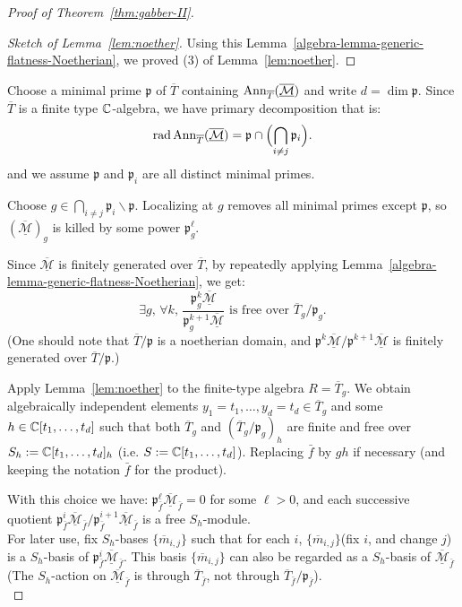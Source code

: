 \begin{proof}[Proof of Theorem~\ref{thm:gabber-II}]
\begin{proof}[Sketch of Lemma~\ref{lem:noether}]
		Using this Lemma~\ref{algebra-lemma-generic-flatness-Noetherian}, we proved (3) of Lemma~\ref{lem:noether}.
	\end{proof}



	Choose a minimal prime $\mathfrak p$ of $\overline T$ containing $\operatorname{Ann}_{\overline T}(\overline{\underline{\mathcal M}})$
	and write $d=\dim \mathfrak p$. Since $\overline T$ is a finite type $\mathbb{C}$-algebra, we have primary decomposition that is:
	\[
		\operatorname{rad}\operatorname{Ann}_{\overline T}(\overline{\underline{\mathcal M}})
		= \mathfrak p \cap \Bigl(\bigcap_{i\ne j} \mathfrak p_i\Bigr).
	\]
	and we assume $\mathfrak p$ and $\mathfrak p_i$ are all distinct minimal primes.

	Choose $g\in\bigcap_{i\ne j}\mathfrak p_i\smallsetminus \mathfrak p$. Localizing at $g$ removes all
	minimal primes except $\mathfrak p$, so $(\overline{\underline{\mathcal M}})_{g}$ is killed by some power
	$\mathfrak p_{g}^\ell$.

	Since $\overline{\underline{\mathcal M}}$ is finitely generated over $\overline T$, by repeatedly applying Lemma~\ref{algebra-lemma-generic-flatness-Noetherian}, we get:
	\[
		\exists g,\, \forall k,\, \frac{\mathfrak p^k_g \overline{\underline{\mathcal M}}}{\mathfrak p^{k+1}_g \overline{\underline{\mathcal M}}} \text{ is free over } \overline{T}_g/\mathfrak p_g.
	\]
	(One should note that $\overline{T}/ \mathfrak p$ is a noetherian domain, and $\mathfrak p^k \overline{\underline{\mathcal M}}/ \mathfrak p^{k+1} \overline{\underline{\mathcal M}}$ is finitely generated over $\overline{T}/ \mathfrak p$.)


	Apply Lemma~\ref{lem:noether} to the finite-type algebra $R=\overline T_{g}$. We obtain algebraically
	independent elements $y_1=t_1,\dots,y_d=t_d\in\overline T_{g}$ and some $h\in\mathbb{C}[t_1,\dots,t_d]$ such that both $\overline T_{g}$ and $(\overline T_{g}/\mathfrak p_{g})_h$ are finite and free
	over $S_h:=\mathbb{C}[t_1,\dots,t_d]_h$ (i.e. $S:=\mathbb{C}[t_1,\dots,t_d]$). Replacing $\bar f$ by $g h$ if necessary (and keeping the notation $\bar f$
	for the product).

	With this choice we have:
	$\mathfrak p_{\bar f}^\ell\overline{\underline{\mathcal M}}_{\bar f}=0$ for some $\ell>0$, and each successive
	quotient $\mathfrak p_{\bar f}^i\overline{\underline{\mathcal M}}_{\bar f} / \mathfrak p_{\bar f}^{i+1}\overline{\underline{\mathcal M}}_{\bar f}$
	is a free $S_h$-module. \\

	For later use, fix $S_h$-bases
	$\{\overline m_{i,j}\}$ such that for each $i$, $\{\overline m_{i,j}\}$(fix $i$, and change $j$) is a $S_h$-basis of
	$\mathfrak p_{\bar f}^i\overline{\underline{\mathcal M}}_{\bar f}$.
	This basis $\{\overline m_{i,j}\}$ can also be regarded as a $S_h$-basis of $\overline{\underline{\mathcal M}}_{\bar f}$
	(The $S_h$-action on $\overline{\underline{\mathcal M}}_{\bar f}$ is through $\overline{T}_{\bar f}$, not through $\overline{T}_{\bar f}/\mathfrak p_{\bar f}$).\\


\end{proof}
